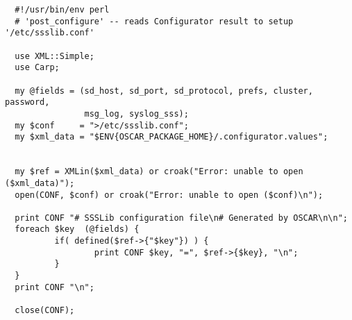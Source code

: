 \begin{scriptsize}
\begin{verbatim}
  #!/usr/bin/env perl
  # 'post_configure' -- reads Configurator result to setup '/etc/ssslib.conf'

  use XML::Simple;
  use Carp;

  my @fields = (sd_host, sd_port, sd_protocol, prefs, cluster, password, 
                msg_log, syslog_sss);
  my $conf     = ">/etc/ssslib.conf";
  my $xml_data = "$ENV{OSCAR_PACKAGE_HOME}/.configurator.values";


  my $ref = XMLin($xml_data) or croak("Error: unable to open ($xml_data)");
  open(CONF, $conf) or croak("Error: unable to open ($conf)\n");

  print CONF "# SSSLib configuration file\n# Generated by OSCAR\n\n";
  foreach $key  (@fields) {
          if( defined($ref->{"$key"}) ) {
                  print CONF $key, "=", $ref->{$key}, "\n";
          }
  }
  print CONF "\n";

  close(CONF);
\end{verbatim}
\end{scriptsize}
